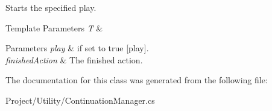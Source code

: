 Starts the specified play. 


\begin{DoxyTemplParams}{Template Parameters}
{\em T} & \\
\hline
\end{DoxyTemplParams}

\begin{DoxyParams}{Parameters}
{\em play} & if set to {\ttfamily true} \mbox{[}play\mbox{]}.\\
\hline
{\em finished\+Action} & The finished action.\\
\hline
\end{DoxyParams}


The documentation for this class was generated from the following file\+:\begin{DoxyCompactItemize}
\item 
Project/\+Utility/Continuation\+Manager.\+cs\end{DoxyCompactItemize}
